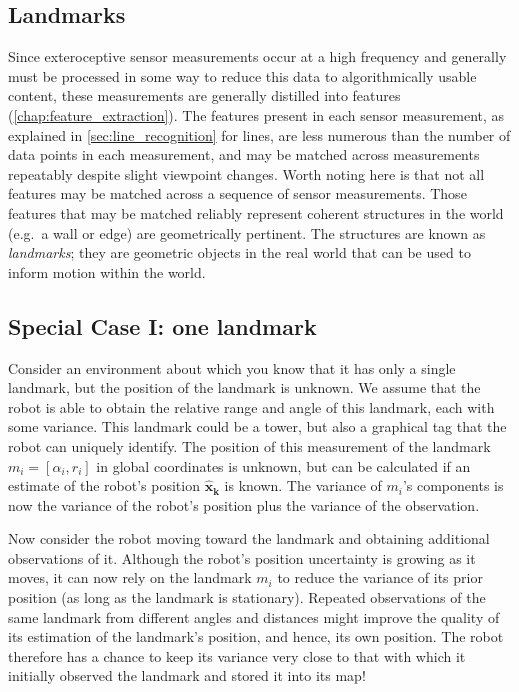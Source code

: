 \subsection{Landmarks}
Since exteroceptive sensor measurements occur at a high frequency and generally must be processed in some way to reduce this data to algorithmically usable content, these measurements are generally distilled into features (\cref{chap:feature_extraction}). The features present in each sensor measurement, as explained in \cref{sec:line_recognition} for lines, are less numerous than the number of data points in each measurement, and may be matched across measurements repeatably despite slight viewpoint changes. Worth noting here is that not all features may be matched across a sequence of sensor measurements. Those features that may be matched reliably represent coherent structures in the world (e.g.\ a wall or edge) are geometrically pertinent. The structures are known as \emph{landmarks};  they are geometric objects in the real world that can be used to inform motion within the world.

\subsection{Special Case I: one landmark}
Consider an environment about which you know that it has only a single landmark, but the position of the landmark is unknown. %
 We assume that the robot is able to obtain the relative range and angle of this landmark, each with some variance. This landmark could be a tower, but also a graphical tag that the robot can uniquely identify. The position of this measurement of the landmark $m_i=[\alpha_i,r_i]$  in global coordinates is unknown, but can be calculated if an estimate of the robot's position $\boldsymbol{\hat{x}_k}$ is known.  The variance of $ m_i$'s components is now the variance of the robot's position plus the variance of the observation.

Now consider the robot moving toward the landmark and obtaining additional observations of it. Although the robot's position uncertainty is growing as it moves, it can now rely on the landmark $m_i$ to reduce the variance of its prior position (as long as the landmark is stationary). Repeated observations of the same landmark from different angles and distances might improve the quality of its estimation of the landmark's position, and hence, its own position. The robot therefore has a chance to keep its variance very close to that with which it initially observed the landmark and stored it into its map!

